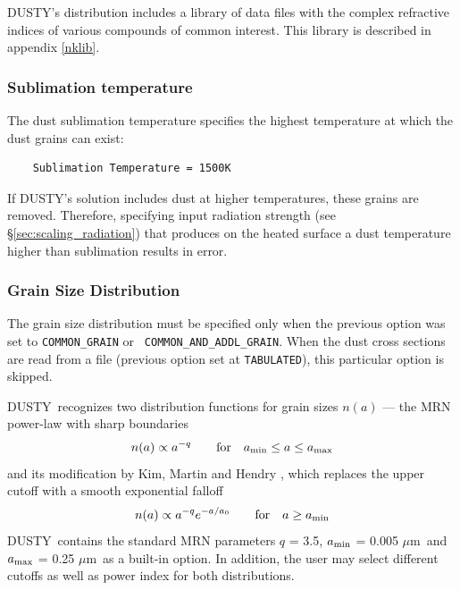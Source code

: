 \documentclass[11pt]{article}
\def\D    {{\sf DUSTY}}
\def\eq#1{\begin{equation} #1 \end{equation}}
\def\mic    {\hbox{$\mu$m}}
\begin{document}
\D's distribution includes a library of data files with the complex
refractive indices of various compounds of common interest. This
library is described in appendix \ref{nklib}.

\subsubsection{Sublimation temperature}
\label{sec:sub_temp}

The dust sublimation temperature specifies the highest temperature at
which the dust grains can exist:
\begin{verbatim}
    Sublimation Temperature = 1500K
\end{verbatim}
If \D's solution includes dust at higher temperatures, these grains
are removed. Therefore, specifying input radiation strength (see
\S\ref{sec:scaling_radiation}) that produces on the heated surface a
dust temperature higher than sublimation results in error.

\subsubsection{Grain Size Distribution}

The grain size distribution must be specified only when the previous
option was set to {\tt COMMON\_GRAIN} or {\tt
  COMMON\_AND\_ADDL\_GRAIN}.  When the dust cross sections are read
from a file (previous option set at {\tt TABULATED}), this particular
option is skipped.

\D\ recognizes two distribution functions for grain sizes $n(a)$ ---
the MRN \cite{MRN77} power-law with sharp boundaries \eq{ n(a) \propto
  a^{-q} \qquad \hbox{for} \quad a_{\rm min} \le a \le a_{\rm max} }
and its modification by Kim, Martin and Hendry \cite{KMH94}, which
replaces the upper cutoff with a smooth exponential falloff \eq{ n(a)
  \propto a^{-q} e^{-a/a_0} \qquad \hbox{for} \quad a \ge a_{\rm min}}
\D\ contains the standard MRN parameters $q$ = 3.5, $a_{\rm min}$ =
0.005 \mic\ and $a_{\rm max}$ = 0.25 \mic\ as a built-in option.  In
addition, the user may select different cutoffs as well as power index
for both distributions.
\end{document}
